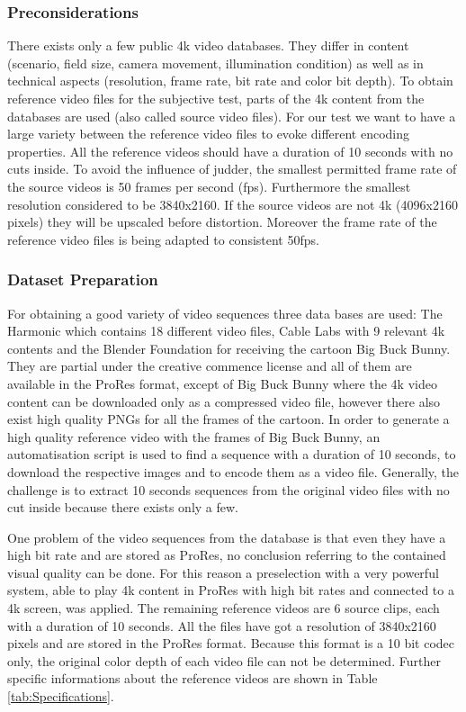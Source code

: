 \subsubsection{Preconsiderations}
There exists only a few public 4k video databases. They differ in content (scenario, field size, camera movement, illumination condition) as well as in technical aspects (resolution, frame rate, bit rate and color bit depth). 
To obtain reference video files for the subjective test, parts of the 4k content from the databases are used (also called source video files).
For our test we want to have a large variety between the reference video files to evoke different encoding properties. 
All the reference videos should have a duration of 10 seconds with no cuts inside.
To avoid the influence of judder, the smallest permitted frame rate of the source videos is 50 frames per second (fps). Furthermore the smallest resolution considered to be 3840x2160. If the source videos are not 4k (4096x2160 pixels) they will be upscaled before distortion. Moreover the frame rate of the reference video files is being adapted to consistent 50fps.
\newline

\subsubsection{Dataset Preparation}
For obtaining a good variety of video sequences three data bases are used: The Harmonic \cite{web:harmonic} which contains 18 different video files, Cable Labs \cite{web:cablelabs} with 9 relevant 4k contents and the Blender Foundation \cite{web:bbb} for receiving the cartoon Big Buck Bunny. They  are partial under the creative commence license and all of them are available in the ProRes format, except of Big Buck Bunny where the 4k video content can be downloaded only as a compressed video file, however there also exist high quality PNGs for all the frames of the cartoon. In order to generate a high quality reference video with the frames of Big Buck Bunny, an automatisation script is used to find a sequence with a duration of 10 seconds, to download the respective images and to encode them as a video file.
Generally, the challenge is to extract 10 seconds sequences from the original video files with no cut inside because there exists only a few.

One problem of the video sequences from the database is that even they have a high bit rate and are stored as ProRes, no conclusion referring to the contained visual quality can be done. 
For this reason a preselection with a very powerful system, able to play 4k content in ProRes with high bit rates and connected to a 4k screen, was applied.
The remaining reference videos are 6 source clips, each with a duration of 10 seconds. All the files have got a resolution of 3840x2160 pixels and are stored in the ProRes format. Because this format is a 10 bit codec only, the original color depth of each video file can not be determined.
Further specific informations about the reference videos are shown in Table \ref{tab:Specifications}.

